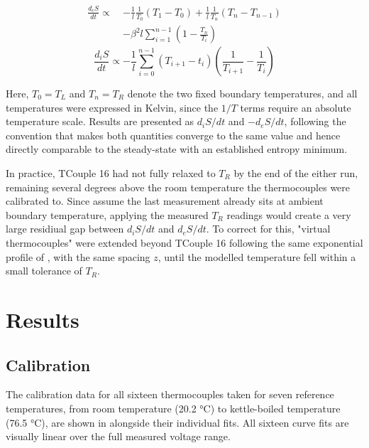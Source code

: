 \documentclass[11pt, a4paper, twocolumn]{article}
\begin{document}
\vspace{-3ex}
\begin{equation}\label{eq:11}
\begin{split}
\frac{d_eS}{dt} \propto\ 
&-\frac{1}{l}\frac{1}{T_0}(T_1-T_0) + \frac{1}{l}\frac{1}{T_n}(T_n-T_{n-1}) \\
&- \beta^2 l\sum_{i=1}^{n-1}\left(1-\frac{T_n}{T_i}\right)
\end{split}
\end{equation}
\vspace{-1ex}
\begin{equation} \label{eq:12}
  \frac{d_i S}{dt} \propto -\frac{1}{l} \sum^{n-1}_{i=0} (T_{i+1} - t_i) \left( \frac{1}{T_{i+1}} - \frac{1}{T_i} \right)
\end{equation}

Here, $T_0 = T_L$ and $T_n = T_R$ denote the two fixed boundary temperatures, and all temperatures were expressed in Kelvin, since the $1/T$ terms require an absolute temperature scale. Results are presented as $d_iS/dt$ and $-d_eS/dt$, following the convention that makes both quantities converge to the same value and hence directly comparable to the steady-state with an established entropy minimum.

In practice, TCouple 16 had not fully relaxed to $T_R$ by the end of the either run, remaining several degrees above the room temperature the thermocouples were calibrated to. Since  assume the last measurement already sits at ambient boundary temperature, applying the measured $T_R$ readings would create a very large residiual gap between $d_iS/dt$ and $d_eS/dt$. To correct for this, "virtual thermocouples" were extended beyond TCouple 16 following the same exponential profile of , with the same spacing $z$, until the modelled temperature fell within a small tolerance of $T_R$.

\section{Results} \label{sec:3}

\subsection{Calibration} \label{sec:3.1}

The calibration data for all sixteen thermocouples taken for seven reference temperatures, from room temperature (20.2 °C) to kettle-boiled temperature (76.5 °C), are shown in  alongside their individual fits. All sixteen curve fits are visually linear over the full measured voltage range.
\end{document}
